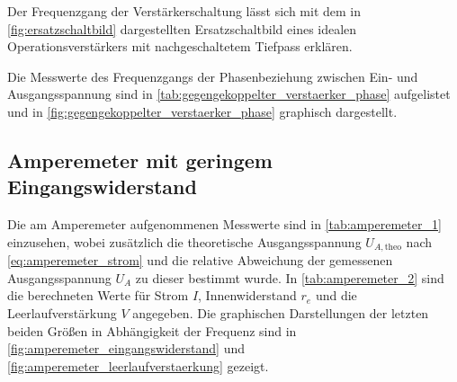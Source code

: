 














Der Frequenzgang der Verstärkerschaltung lässt sich mit dem in 
\cref{fig:ersatzschaltbild} dargestellten Ersatzschaltbild eines idealen 
Operationsverstärkers 
mit nachgeschaltetem Tiefpass erklären.



Die Messwerte des Frequenzgangs der Phasenbeziehung zwischen Ein- und 
Ausgangsspannung sind in \cref{tab:gegengekoppelter_verstaerker_phase}
aufgelistet und in \cref{fig:gegengekoppelter_verstaerker_phase} graphisch 
dargestellt. 






\subsection{Amperemeter mit geringem Eingangswiderstand}

Die am Amperemeter aufgenommenen Messwerte sind in \cref{tab:amperemeter_1}
einzusehen, wobei zusätzlich die theoretische Ausgangsspannung 
$U_{A,\mathrm{theo}}$ nach \cref{eq:amperemeter_strom}
und die relative Abweichung der gemessenen Ausgangsspannung $U_A$ zu dieser 
bestimmt wurde. 
In  \cref{tab:amperemeter_2} sind die berechneten Werte für Strom $I$, 
Innenwiderstand $r_e$ und die Leerlaufverstärkung $V$ angegeben. 
Die graphischen Darstellungen der letzten beiden Größen in Abhängigkeit der
Frequenz sind in 
\cref{fig:amperemeter_eingangswiderstand} und 
\cref{fig:amperemeter_leerlaufverstaerkung} gezeigt.





